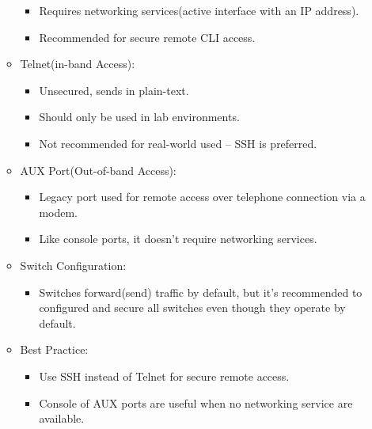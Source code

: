 \documentclass[a4paper,11pt]{article}
\begin{document}
\begin{itemize}
\begin{itemize}
\begin{itemize}
            \item Requires networking services(active interface with an IP address).\\
            \item Recommended for secure remote CLI access.\\
        \end{itemize}
        \item Telnet(in-band Access):\\
        \begin{itemize}
            \item Unsecured, sends in plain-text.\\
            \item Should only be used in lab environments.\\
            \item Not recommended for real-world used -- SSH is preferred.\\
        \end{itemize}
        \item AUX Port(Out-of-band Access):\\
        \begin{itemize}
            \item Legacy port used for remote access over telephone connection via a modem.\\
            \item Like console ports, it doesn't require networking services.\\
        \end{itemize}
        \item Switch Configuration:\\
        \begin{itemize}
            \item Switches forward(send) traffic by default, but it's recommended to configured and secure all switches even though they operate by default.\\
        \end{itemize}
        \item Best Practice:\\
        \begin{itemize}
            \item Use SSH instead of Telnet for secure remote access.\\
            \item Console of AUX ports are useful when no networking service are available.\\
        \end{itemize}
    \end{itemize}
\end{itemize}
\end{document}
